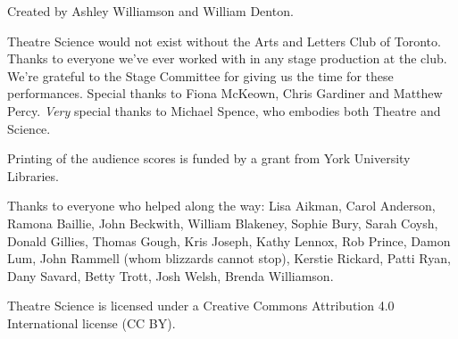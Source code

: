 Created by Ashley Williamson and William Denton.

Theatre Science would not exist without the Arts and Letters Club of Toronto.  Thanks to everyone we've ever worked with in any stage production at the club.  We're grateful to the Stage Committee for giving us the time for these performances. Special thanks to Fiona McKeown, Chris Gardiner and Matthew Percy.  \textit{Very} special thanks to Michael Spence, who embodies both Theatre and Science.

Printing of the audience scores is funded by a grant from York University Libraries.

Thanks to everyone who helped along the way:  Lisa Aikman, Carol Anderson, Ramona Baillie, John Beckwith, William Blakeney, Sophie Bury, Sarah Coysh, Donald Gillies, Thomas Gough, Kris Joseph, Kathy Lennox, Rob Prince, Damon Lum, John Rammell (whom blizzards cannot stop), Kerstie Rickard, Patti Ryan, Dany Savard, Betty Trott, Josh Welsh, Brenda Williamson.

Theatre Science is licensed under a Creative Commons Attribution 4.0 International license (CC BY).  %
